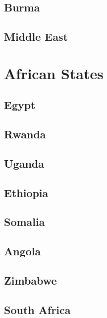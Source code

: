 \subsection*{Burma}

\subsection*{Middle East}

\section{African States}

\subsection*{Egypt}

\subsection*{Rwanda}

\subsection*{Uganda}

\subsection*{Ethiopia}

\subsection*{Somalia}

\subsection*{Angola}

\subsection*{Zimbabwe}

\subsection*{South Africa}
